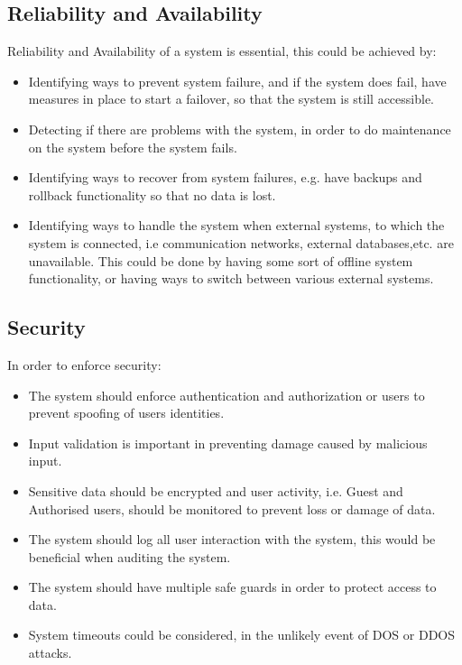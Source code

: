 
\subsection{Reliability and Availability}
Reliability and Availability of a system is essential, this could be achieved by:
\begin{itemize}
\item Identifying ways to prevent system failure, and if the system does fail, have measures in place to start a failover, so that the system is still accessible.
\item Detecting if there are problems with the system, in order to do maintenance on the system before the system fails.
\item Identifying ways to recover from system failures, e.g. have backups and rollback functionality so that no data is lost.
\item Identifying ways to handle the system when external systems, to which the system is connected, i.e communication networks, external databases,etc. are unavailable. This could be done by having some sort of offline system functionality, or having ways to switch between various external systems.
\end{itemize}


\subsection{Security}
In order to enforce security:
\begin{itemize}
 \item The system should enforce authentication and authorization or users to prevent spoofing of users identities.
 \item Input validation is important in preventing damage caused by malicious input.
 \item Sensitive data should be encrypted and user activity, i.e. Guest and Authorised users, should be monitored to prevent loss or damage of data.
 \item The system should log all user interaction with the system, this would be beneficial when auditing the system.
 \item The system should have multiple safe guards in order to protect access to data.
 \item System timeouts could be considered, in the unlikely event of DOS or DDOS attacks.
\end{itemize}

